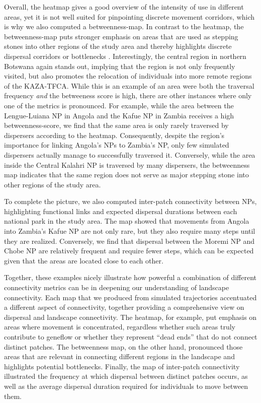 \documentclass[abstract=on,10pt,a4paper,bibliography=totocnumbered]{article}
\begin{document}
Overall, the heatmap gives a good overview of the intensity of use in different
areas, yet it is not well suited for pinpointing discrete movement corridors,
which is why we also computed a betweenness-map. In contrast to the heatmap, the
betweenness-map puts stronger emphasis on areas that are used as stepping stones
into other regions of the study area and thereby highlights discrete dispersal
corridors or bottlenecks \citep{BastilleRousseau.2018}. Interestingly, the
central region in northern Botswana again stands out, implying that the region
is not only frequently visited, but also promotes the relocation of individuals
into more remote regions of the KAZA-TFCA. While this is an example of an area
were both the traversal frequency \textit{and} the betweeness score is high,
there are other instances where only one of the metrics is pronounced. For
example, while the area between the Lengue-Luiana NP in Angola and the Kafue NP
in Zambia receives a high betweenness-score, we find that the same area is only
rarely traversed by dispersers according to the heatmap. Consequently, despite
the region's importance for linking Angola's NPs to Zambia's NP, only few
simulated dispersers actually manage to successfully traversed it. Conversely,
while the area inside the Central Kalahri NP is traversed by many dispersers,
the betweenness map indicates that the same region does not serve as major
stepping stone into other regions of the study area.

To complete the picture, we also computed inter-patch connectivity between NPs,
highlighting functional links and expected dispersal durations between each
national park in the study area. The map showed that movements from Angola into
Zambia's Kafue NP are not only rare, but they also require many steps until they
are realized. Conversely, we find that dispersal between the Moremi NP and Chobe
NP are relatively frequent and require fewer steps, which can be expected given
that the areas are located close to each other.

Together, these examples nicely illustrate how powerful a combination of
different connectivity metrics can be in deepening our understanding of
landscape connectivity. Each map that we produced from simulated trajectories
accentuated a different aspect of connectivity, together providing a
comprehensive view on dispersal and landscape connectivity. The heatmap, for
example, put emphasis on areas where movement is concentrated, regardless
whether such areas truly contribute to geneflow or whether they represent ``dead
ends'' that do not connect distinct patches. The betweenness map, on the other
hand, pronounced those areas that are relevant in connecting different regions
in the landscape and highlights potential bottlenecks. Finally, the map of
inter-patch connectivity illustrated the frequency at which dispersal between
distinct patches occurs, as well as the average dispersal duration required for
individuals to move between them.
\end{document}

